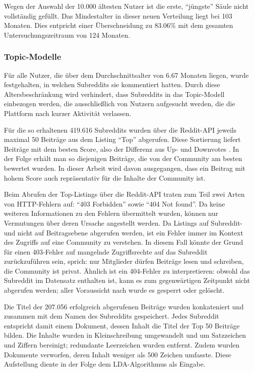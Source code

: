 \documentclass[11pt,a4paper,twoside]{article}
\begin{document}
Wegen der Auswahl der 10.000 ältesten Nutzer ist die erste,
\enquote{jüngste} Säule nicht vollständig gefüllt. Das Mindestalter in
dieser neuen Verteilung liegt bei 103 Monaten. Dies entpricht einer
Überschneidung zu 83.06\% mit dem gesamten Untersuchungszeitraum von 124
Monaten.

\hypertarget{topic-modelle-1}{%
\subsubsection{Topic-Modelle}\label{topic-modelle-1}}

Für alle Nutzer, die über dem Durchschnittsalter von 6.67 Monaten
liegen, wurde festgehalten, in welchen Subreddits sie kommentiert
hatten. Durch diese Altersbeschränkung wird verhindert, dass Subreddits
in das Topic-Modell einbezogen werden, die ausschließlich von Nutzern
aufgesucht werden, die die Plattform nach kurzer Aktivität verlassen.

Für die so erhaltenen 419.616 Subreddits wurden über die Reddit-API
jeweils maximal 50 Beiträge aus dem Listing \enquote{Top} abgerufen.
Diese Sortierung liefert Beiträge mit dem besten Score, also der
Differenz aus Up- und Downvotes \autocite{RedditSrc}. In der Folge
erhält man so diejenigen Beiträge, die von der Community am besten
bewertet wurden. In dieser Arbeit wird davon ausgegangen, dass ein
Beitrag mit hohem Score auch repräsentativ für die Inhalte der Community
ist.

Beim Abrufen der Top-Listings über die Reddit-API traten zum Teil zwei
Arten von HTTP-Fehlern auf: \enquote{403 Forbidden} sowie \enquote{404
Not found}. Da keine weiteren Informationen zu den Fehlern übermittelt
wurden, können nur Vermutungen über deren Ursache angestellt werden. Da
Listings auf Subreddit- und nicht auf Beitragsebene abgerufen werden,
ist ein Fehler immer im Kontext des Zugriffs auf eine Community zu
verstehen. In diesem Fall könnte der Grund für einen 403-Fehler auf
mangelnde Zugriffsrechte auf das Subreddit zurückzuführen sein, sprich:
nur Mitglieder dürfen Beiträge lesen und schreiben, die Community ist
privat. Ähnlich ist ein 404-Fehler zu interpretieren: obwohl das
Subreddit im Datensatz enthalten ist, kann es zum gegenwärtigen
Zeitpunkt nicht abgerufen werden; aller Voraussicht nach wurde es
gesperrt oder gelöscht.

Die Titel der 207.056 erfolgreich abgerufenen Beiträge wurden
konkateniert und zusammen mit dem Namen des Subreddits gespeichert.
Jedes Subreddit entspricht damit einem Dokument, dessen Inhalt die Titel
der Top 50 Beiträge bilden. Die Inhalte wurden in Kleinschreibung
umgewandelt und um Satzzeichen und Ziffern bereinigt; redundante
Leerzeichen wurden entfernt. Zudem wurden Dokumente verworfen, deren
Inhalt weniger als 500 Zeichen umfasste. Diese Aufstellung diente in der
Folge dem LDA-Algorithmus als Eingabe.
\end{document}
